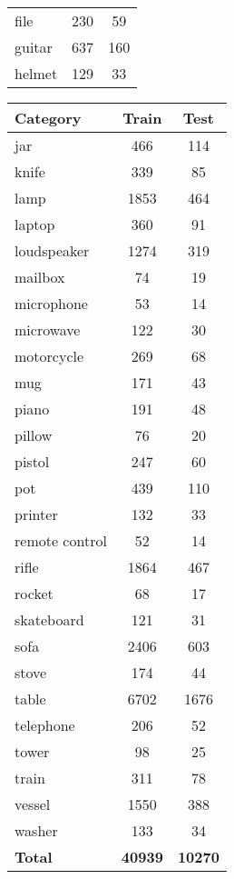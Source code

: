 \begin{table}[]
\begin{tabular}[t]{lcc}
		file               & 230            & 59            \\
		guitar             & 637            & 160           \\ 
		helmet             & 129            & 33 \\
		\hline
	\end{tabular}
	\begin{tabular}[t]{lcc}
		\hline
		\textbf{Category} & \textbf{Train} & \textbf{Test}  \\ \hline
		jar               & 466            & 114            \\
		knife             & 339            & 85             \\
		lamp              & 1853           & 464            \\
		laptop            & 360            & 91             \\
		loudspeaker       & 1274           & 319            \\
		mailbox           & 74             & 19             \\
		microphone        & 53             & 14             \\
		microwave         & 122            & 30             \\
		motorcycle        & 269            & 68             \\
		mug               & 171            & 43             \\
		piano             & 191            & 48             \\
		pillow            & 76             & 20             \\
		pistol            & 247            & 60             \\
		pot               & 439            & 110            \\
		printer           & 132            & 33             \\
		remote control    & 52             & 14             \\
		rifle             & 1864           & 467            \\
		rocket            & 68             & 17             \\
		skateboard        & 121            & 31             \\
		sofa              & 2406           & 603            \\
		stove             & 174            & 44             \\
		table             & 6702           & 1676           \\
		telephone         & 206            & 52             \\
		tower             & 98             & 25             \\
		train             & 311            & 78             \\
		vessel            & 1550           & 388            \\
		washer            & 133            & 34             \\
		\textbf{Total}    & \textbf{40939} & \textbf{10270} \\ \hline
	\end{tabular}
	

\end{table}
